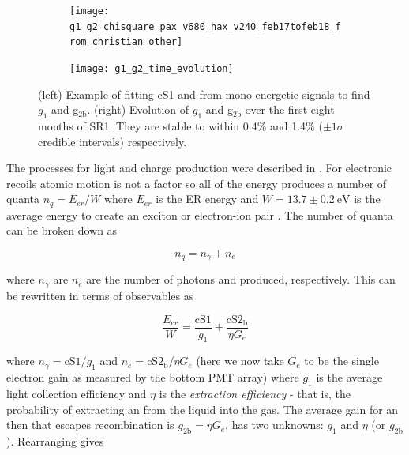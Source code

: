 \begin{figure}
    \begin{subfigure}[t]{0.4\textwidth}
        \texttt{[image: g1\_g2\_chisquare\_pax\_v680\_hax\_v240\_feb17tofeb18\_from\_christian\_other]}
    \end{subfigure}%
    \begin{subfigure}[t]{0.65\textwidth}
        \texttt{[image: g1\_g2\_time\_evolution]}
    \end{subfigure}
    \caption{(left) Example of fitting cS1 and \cstwob from mono-energetic signals to find $g_1$ and g$_{2\mathrm{b}}$.  (right) Evolution
    of $g_1$ and g$_{2\mathrm{b}}$ over the first eight months of SR1.  They are stable to within 0.4\% and 1.4\% ($\pm 1 \sigma$ credible
    intervals) respectively.}
	\label{fig:calibrations_photon_charge_efficiences_g1_g2}
\end{figure}

The processes
for light and charge production were described in .  For electronic recoils atomic motion is
not a factor so all of the energy produces a number of quanta $n_q = E_{er} / W$ where $E_{er}$ is the ER energy and
$W = 13.7 \pm 0.2\ \mathrm{eV}$ is the average energy to create an exciton or electron-ion pair .  The number of quanta
can be broken down as

\begin{equation}
n_q = n_{\gamma} + n_e
\end{equation}

\noindent where $n_{\gamma}$ are $n_e$ are the number of photons and \electron produced, respectively.  This can be rewritten in terms of
observables as

\begin{equation}
\frac{E_{er}}{W} = \frac{\mathrm{cS1}}{g_1} + \frac{\mathrm{cS2_b}}{\eta G_e}
\label{eq:calibrations_s1_s2}
\end{equation}

\noindent where $n_{\gamma} = \mathrm{cS1} / g_1$ and $n_e = \mathrm{cS2_b} / \eta G_e$ (here we now take $G_e$ to be the single electron
gain as measured by the bottom PMT array) where $g_1$ is the average light collection
efficiency and $\eta$
is the \textit{extraction efficiency} - that is, the probability of extracting an \electron from the liquid into the gas.  The average
gain for an \electron then that escapes recombination is $g_{2 \mathrm{b}} = \eta G_e$.   has two unknowns:
$g_1$ and $\eta$ (or $g_{2 \mathrm{b}}$).  Rearranging gives

